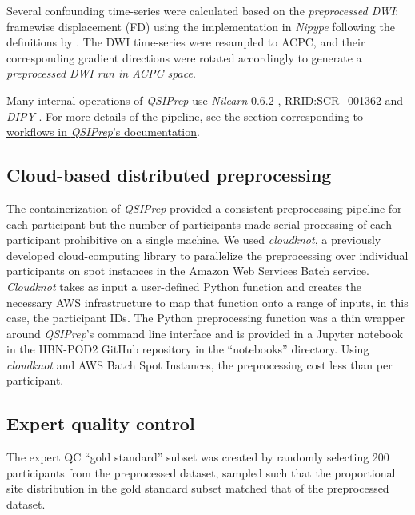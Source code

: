 \documentclass[fleqn,10pt,inline]{wlscirep}
\begin{document}
\begin{itemize}
Several confounding time-series were calculated based on the
\emph{preprocessed DWI}: framewise displacement (FD) using the implementation
in \emph{Nipype} following the definitions by \cite{power-fd-dvars}. The DWI
time-series were resampled to ACPC, and their corresponding gradient directions
were rotated accordingly to generate a \emph{preprocessed DWI run
in ACPC space}. 

\end{itemize}

Many internal operations of \emph{QSIPrep} use \emph{Nilearn} 0.6.2
\cite{nilearn}, RRID:SCR\_001362 and \emph{DIPY} \cite{dipy}. For more details
of the pipeline, see
\href{https://qsiprep.readthedocs.io/en/latest/workflows.html}{the section
corresponding to workflows in \emph{QSIPrep}'s documentation}.

\subsection*{Cloud-based distributed preprocessing}

The containerization of \emph{QSIPrep} provided a consistent preprocessing
pipeline for each participant but the number of participants made serial processing of
each participant prohibitive on a single machine. We used \emph{cloudknot}, a
previously developed cloud-computing library \cite{cloudknot} to
parallelize the preprocessing over individual participants on spot instances in the
Amazon Web Services Batch service. \emph{Cloudknot} takes as input a
user-defined Python function and creates the necessary AWS infrastructure to map
that function onto a range of inputs, in this case, the participant IDs. The Python
preprocessing function was a thin wrapper around \emph{QSIPrep}'s command line
interface and is provided in a Jupyter notebook in the HBN-POD2 GitHub
repository in the ``notebooks'' directory. Using \emph{cloudknot} and AWS Batch
Spot Instances, the preprocessing cost less than  per participant.

\subsection*{Expert quality control}

The expert QC ``gold standard'' subset was created by randomly selecting 200
participants from the preprocessed dataset, sampled such that the proportional site
distribution in the gold standard subset matched that of the preprocessed
dataset.
\end{document}
